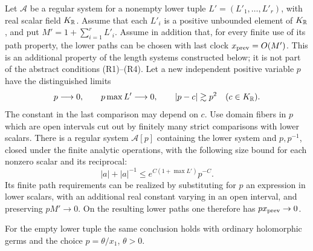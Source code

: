 \begin{lemma}\label{path:adjoin-p}
Let \(\mathcal A\) be a regular system for a nonempty lower tuple
\(L'=(L'_1,\ldots,L'_r)\), with real scalar field \(K_{\mathbb{R}}\).
Assume that each \(L'_i\) is a positive unbounded element of
\(K_{\mathbb{R}}\), and put \(M'=1+\sum_{i=1}^rL'_i\).  Assume in addition
that, for every finite use of its path property, the lower paths can
be chosen with last clock \(x_{\rm prev}=O(M')\).  This is an
additional property of the length systems constructed below; it is
not part of the abstract conditions \textup{(R1)--(R4)}.
Let a new independent positive variable \(p\) have the distinguished limits
\[
 p\longrightarrow0,\qquad p\max L'\longrightarrow0,
 \qquad |p-c|\gtrsim p^2\quad(c\in K_{\mathbb{R}}).
\]
The constant in the last comparison may depend on \(c\).  Use domain
fibers in \(p\) which are open intervals cut out by finitely many
strict comparisons with lower scalars.  There is a regular system
\(\mathcal A[p]\) containing the lower system and \(p,p^{-1}\),
closed under the finite analytic operations, with the following size
bound for each nonzero scalar and its reciprocal:
\begin{equation}\label{path:eq-p-size}
 |a|+|a|^{-1}\le e^{C(1+\max L')}p^{-C}.
\end{equation}
Its finite path requirements can be realized by substituting for \(p\)
an expression in lower scalars, with an additional real constant varying
in an open interval, and preserving \(pM'\to0\).  On the resulting
lower paths one therefore has \(px_{\rm prev}\to0\).

For the empty lower tuple the same conclusion holds with ordinary
holomorphic germs and the choice \(p=\theta/x_1\), \(\theta>0\).
\end{lemma}
